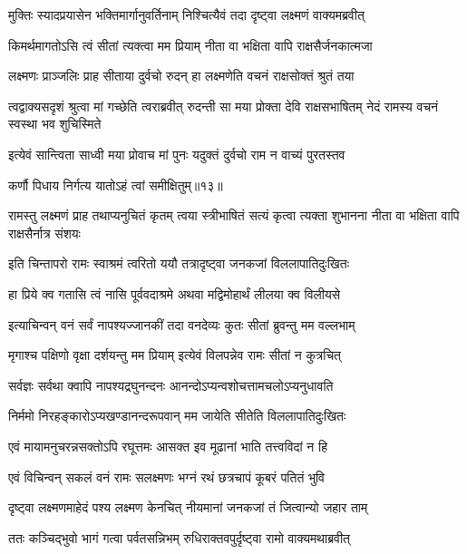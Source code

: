 \twolineshloka
{मुक्तिः स्यादप्रयासेन भक्तिमार्गानुवर्तिनाम्}
{निश्चित्यैवं तदा दृष्ट्वा लक्ष्मणं वाक्यमब्रवीत्} %

\twolineshloka
{किमर्थमागतोऽसि त्वं सीतां त्यक्त्वा मम प्रियाम्}
{नीता वा भक्षिता वापि राक्षसैर्जनकात्मजा} %

\twolineshloka
{लक्ष्मणः प्राञ्जलिः प्राह सीताया दुर्वचो रुदन्}
{हा लक्ष्मणेति वचनं राक्षसोक्तं श्रुतं तया} %

\threelineshloka
{त्वद्वाक्यसदृशं श्रुत्वा मां गच्छेति त्वराब्रवीत्}
{रुदन्ती सा मया प्रोक्ता देवि राक्षसभाषितम्}
{नेदं रामस्य वचनं स्वस्था भव शुचिस्मिते} %

\twolineshloka
{इत्येवं सान्त्विता साध्वी मया प्रोवाच मां पुनः}
{यदुक्तं दुर्वचो राम न वाच्यं पुरतस्तव} %

{कर्णौ पिधाय निर्गत्य यातोऽहं त्वां समीक्षितुम्॥१३॥} %


\threelineshloka
{रामस्तु लक्ष्मणं प्राह तथाप्यनुचितं कृतम्}
{त्वया स्त्रीभाषितं सत्यं कृत्वा त्यक्ता शुभानना}
{नीता वा भक्षिता वापि राक्षसैर्नात्र संशयः} %

\twolineshloka
{इति चिन्तापरो रामः स्वाश्रमं त्वरितो ययौ}
{तत्रादृष्ट्वा जनकजां विललापातिदुःखितः} %

\twolineshloka
{हा प्रिये क्व गतासि त्वं नासि पूर्ववदाश्रमे}
{अथवा मद्विमोहार्थं लीलया क्व विलीयसे} %

\twolineshloka
{इत्याचिन्वन् वनं सर्वं नापश्यज्जानकीं तदा}
{वनदेव्यः कुतः सीतां ब्रुवन्तु मम वल्लभाम्} %

\twolineshloka
{मृगाश्च पक्षिणो वृक्षा दर्शयन्तु मम प्रियाम्}
{इत्येवं विलपन्नेव रामः सीतां न कुत्रचित्} %

\twolineshloka
{सर्वज्ञः सर्वथा क्वापि नापश्यद्रघुनन्दनः}
{आनन्दोऽप्यन्वशोचत्तामचलोऽप्यनुधावति} %

\twolineshloka
{निर्ममो निरहङ्कारोऽप्यखण्डानन्दरूपवान्}
{मम जायेति सीतेति विललापातिदुःखितः} %

\twolineshloka
{एवं मायामनुचरन्नसक्तोऽपि रघूत्तमः}
{आसक्त इव मूढानां भाति तत्त्वविदां न हि} %

\twolineshloka
{एवं विचिन्वन् सकलं वनं रामः सलक्ष्मणः}
{भग्नं रथं छत्रचापं कूबरं पतितं भुवि} %

\twolineshloka
{दृष्ट्वा लक्ष्मणमाहेदं पश्य लक्ष्मण केनचित्}
{नीयमानां जनकजां तं जित्वान्यो जहार ताम्} %

\twolineshloka
{ततः कञ्चिद्भुवो भागं गत्वा पर्वतसन्निभम्}
{रुधिराक्तवपुर्दृष्ट्वा रामो वाक्यमथाब्रवीत्} %

